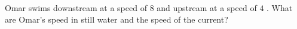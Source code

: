 Omar swims downstream at a speed of $8$  and upstream at a speed of $4$ . What are Omar's speed in still water and the speed of the current?

